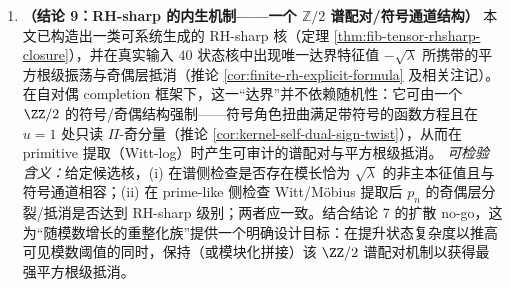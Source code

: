 \begin{enumerate}
  \item \textbf{（结论 9：RH-sharp 的内生机制——一个 \texorpdfstring{$\mathbb{Z}/2$}{Z/2} 谱配对/符号通道结构）}
  本文已构造出一类可系统生成的 RH-sharp 核（定理 \ref{thm:fib-tensor-rhsharp-closure}），并在真实输入 \(40\) 状态核中出现唯一达界特征值 \(-\sqrt{\lambda}\) 所携带的平方根级振荡与奇偶层抵消（推论 \ref{cor:finite-rh-explicit-formula} 及相关注记）。
  在自对偶 completion 框架下，这一“达界”并不依赖随机性：它可由一个 \(\ZZ/2\) 的符号/奇偶结构强制——符号角色扭曲满足带符号的函数方程且在 \(u=1\) 处只读 \(\Pi\)-奇分量（推论 \ref{cor:kernel-self-dual-sign-twist}），从而在 primitive 提取（Witt-log）时产生可审计的谱配对与平方根级抵消。
  \emph{可检验含义：}给定候选核，(i) 在谱侧检查是否存在模长恰为 \(\sqrt{\lambda}\) 的非主本征值且与符号通道相容；(ii) 在 prime-like 侧检查 Witt/Möbius 提取后 \(p_n\) 的奇偶层分裂/抵消是否达到 RH-sharp 级别；两者应一致。结合结论 7 的扩散 no-go，这为“随模数增长的重整化族”提供一个明确设计目标：在提升状态复杂度以推高可见模数阈值的同时，保持（或模块化拼接）该 \(\ZZ/2\) 谱配对机制以获得最强平方根级抵消。
\end{enumerate}

